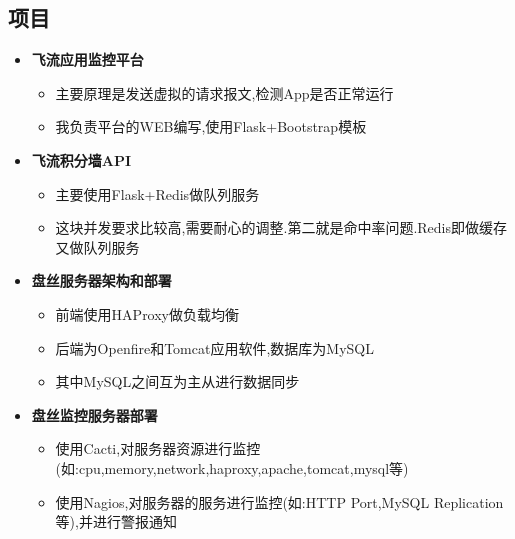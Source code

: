 \documentclass[11pt,letterpaper]{article}
\newcommand{\resitem}[1]{\item #1 \vspace{-2pt}}
\begin{document}
\begin{CJK}{UTF8}{gbsn}
\section{项目}  
       \begin{itemize}
		   \item{\textbf{飞流应用监控平台}}\vspace{-6pt}
                       {\footnotesize
                       \begin{itemize}
							   \resitem{主要原理是发送虚拟的请求报文,检测App是否正常运行}
                               \resitem{我负责平台的WEB编写,使用Flask+Bootstrap模板}
                       \end{itemize}
                       } 
		   \item{\textbf{飞流积分墙API}}\vspace{-6pt}
                       {\footnotesize
                       \begin{itemize}
							   \resitem{主要使用Flask+Redis做队列服务}
                               \resitem{这块并发要求比较高,需要耐心的调整.第二就是命中率问题.Redis即做缓存又做队列服务}
                       \end{itemize}
                       } 
               \item{\textbf{盘丝服务器架构和部署}}\vspace{-6pt}
                       {\footnotesize
                       \begin{itemize}
                               \resitem{前端使用HAProxy做负载均衡}
                               \resitem{后端为Openfire和Tomcat应用软件,数据库为MySQL}
                               \resitem{其中MySQL之间互为主从进行数据同步}
                       \end{itemize}
                       } 
               \item{\textbf{盘丝监控服务器部署}}\vspace{-6pt}
                       {\footnotesize
                       \begin{itemize}
                               \resitem{使用Cacti,对服务器资源进行监控(如:cpu,memory,network,haproxy,apache,tomcat,mysql等)}
                               \resitem{使用Nagios,对服务器的服务进行监控(如:HTTP Port,MySQL Replication等),并进行警报通知}
                       \end{itemize}
                       }
		\end{itemize}


\end{CJK}
\end{document}
